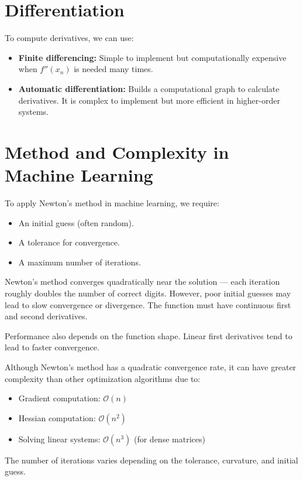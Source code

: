 \documentclass{article}
\begin{document}
\section*{Differentiation}
To compute derivatives, we can use:

\begin{itemize}
    \item \textbf{Finite differencing:} Simple to implement but computationally expensive when \( f''(x_n) \) is needed many times.
    \item \textbf{Automatic differentiation:} Builds a computational graph to calculate derivatives. It is complex to implement but more efficient in higher-order systems.
\end{itemize}

\section*{Method and Complexity in Machine Learning}
To apply Newton’s method in machine learning, we require:
\begin{itemize}
    \item An initial guess (often random).
    \item A tolerance for convergence.
    \item A maximum number of iterations.
\end{itemize}

Newton’s method converges quadratically near the solution — each iteration roughly doubles the number of correct digits. However, poor initial guesses may lead to slow convergence or divergence. The function must have continuous first and second derivatives.

Performance also depends on the function shape. Linear first derivatives tend to lead to faster convergence.

Although Newton’s method has a quadratic convergence rate, it can have greater complexity than other optimization algorithms due to:

\begin{itemize}
    \item Gradient computation: \( \mathcal{O}(n) \)
    \item Hessian computation: \( \mathcal{O}(n^2) \)
    \item Solving linear systems: \( \mathcal{O}(n^3) \) (for dense matrices)
\end{itemize}

The number of iterations varies depending on the tolerance, curvature, and initial guess.
\end{document}
